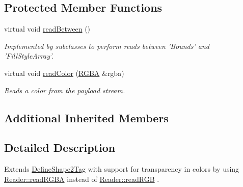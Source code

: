 \subsection*{Protected Member Functions}
\begin{DoxyCompactItemize}
\item 
\hypertarget{classjswf_1_1flash_1_1tags_1_1_define_shape3_tag_a14b7e7770473f51a1658e712d968552c}{virtual void \hyperlink{classjswf_1_1flash_1_1tags_1_1_define_shape3_tag_a14b7e7770473f51a1658e712d968552c}{read\+Between} ()}\label{classjswf_1_1flash_1_1tags_1_1_define_shape3_tag_a14b7e7770473f51a1658e712d968552c}

\begin{DoxyCompactList}\small\item\em Implemented by subclasses to perform reads between 'Bounds' and 'Fill\+Style\+Array'. \end{DoxyCompactList}\item 
virtual void \hyperlink{classjswf_1_1flash_1_1tags_1_1_define_shape3_tag_a23bdaf9f98d600edbc0222c3ba4edc39}{read\+Color} (\hyperlink{structjswf_1_1flash_1_1_r_g_b_a}{R\+G\+B\+A} \&rgba)
\begin{DoxyCompactList}\small\item\em Reads a color from the payload stream. \end{DoxyCompactList}\end{DoxyCompactItemize}
\subsection*{Additional Inherited Members}


\subsection{Detailed Description}
Extends \hyperlink{classjswf_1_1flash_1_1tags_1_1_define_shape2_tag}{Define\+Shape2\+Tag} with support for transparency in colors by using \hyperlink{classjswf_1_1flash_1_1_reader_a2c89e5f540d698d4d4fc4dc983dcf81c}{Reader\+::read\+R\+G\+B\+A} instead of \hyperlink{classjswf_1_1flash_1_1_reader_abba53a3337f589e3641681c2251e4d8d}{Reader\+::read\+R\+G\+B} . 

